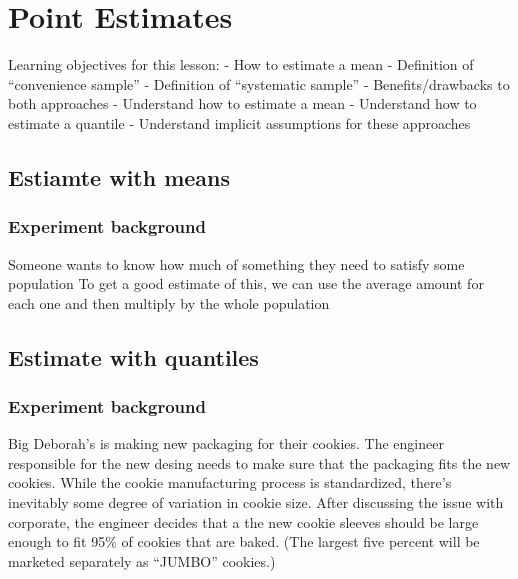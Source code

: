 \documentclass[
]{book}
\theoremstyle{definition}
\theoremstyle{definition}
\theoremstyle{definition}
\theoremstyle{remark}
\begin{document}
\hypertarget{point-estimates}{%
\chapter{Point Estimates}\label{point-estimates}}

Learning objectives for this lesson:
- How to estimate a mean
- Definition of ``convenience sample''
- Definition of ``systematic sample''
- Benefits/drawbacks to both approaches
- Understand how to estimate a mean
- Understand how to estimate a quantile
- Understand implicit assumptions for these approaches

\hypertarget{estiamte-with-means}{%
\section{Estiamte with means}\label{estiamte-with-means}}

\hypertarget{experiment-background-2}{%
\subsection{Experiment background}\label{experiment-background-2}}

Someone wants to know how much of something they need to satisfy some population
To get a good estimate of this, we can use the average amount for each one and then multiply by the whole population

\hypertarget{estimate-with-quantiles}{%
\section{Estimate with quantiles}\label{estimate-with-quantiles}}

\hypertarget{experiment-background-3}{%
\subsection{Experiment background}\label{experiment-background-3}}

Big Deborah's is making new packaging for their cookies. The engineer responsible for the new desing needs to make sure that the packaging fits the new cookies. While the cookie manufacturing process is standardized, there's inevitably some degree of variation in cookie size. After discussing the issue with corporate, the engineer decides that a the new cookie sleeves should be large enough to fit 95\% of cookies that are baked. (The largest five percent will be marketed separately as ``JUMBO'' cookies.)
\end{document}
